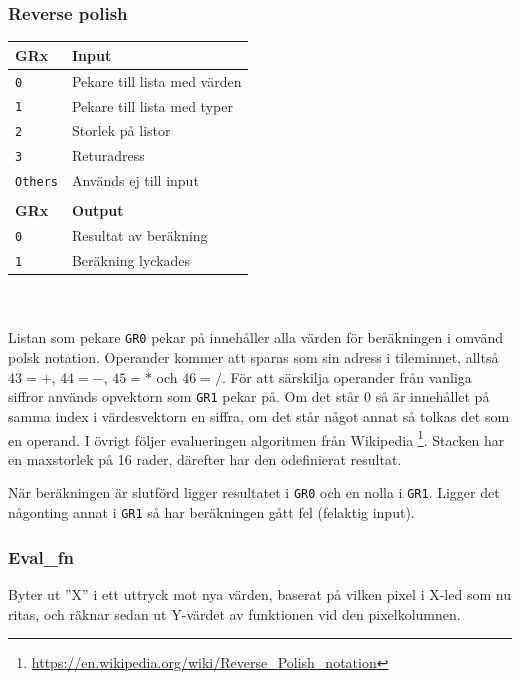 \documentclass[]{article}
\begin{document}
\subsubsection{Reverse polish}
\begin{tabular}{ll}
	\textbf{GRx}    & \textbf{Input}               \\ \hline
	\texttt{0}      & Pekare till lista med värden \\
	\texttt{1}      & Pekare till lista med typer  \\
	\texttt{2}      & Storlek på listor            \\
	\texttt{3}      & Returadress                  \\
	\texttt{Others} & Används ej till input        \\
	                &  \\
	\textbf{GRx}    & \textbf{Output}              \\ \hline
	\texttt{0}      & Resultat av beräkning        \\
	\texttt{1}      & Beräkning lyckades
\end{tabular}
\\\\
\noindent
Listan som pekare \texttt{GR0} pekar på innehåller alla värden för beräkningen i omvänd polsk notation. Operander kommer att sparas som sin adress i tileminnet, alltså $43=+$, $44=-$, $45=*$ och $46=/$. För att särskilja operander från vanliga siffror används opvektorn som \texttt{GR1} pekar på. Om det står 0 så är innehållet på samma index i värdesvektorn en siffra, om det står något annat så tolkas det som en operand. I övrigt följer evalueringen algoritmen från Wikipedia \footnote{\href{https://en.wikipedia.org/wiki/Reverse_Polish_notation\#Postfix_algorithm}{\url{https://en.wikipedia.org/wiki/Reverse_Polish_notation}}}. Stacken har en maxstorlek på 16 rader, därefter har den odefinierat resultat. 

När beräkningen är slutförd ligger resultatet i \texttt{GR0} och en nolla i \texttt{GR1}. Ligger det någonting annat i \texttt{GR1} så har beräkningen gått fel (felaktig input).

\subsubsection{Eval\_fn}

Byter ut ''X'' i ett uttryck mot nya värden, baserat på vilken pixel i X-led som nu ritas, och räknar sedan ut Y-värdet av funktionen vid den pixelkolumnen.
\end{document}
